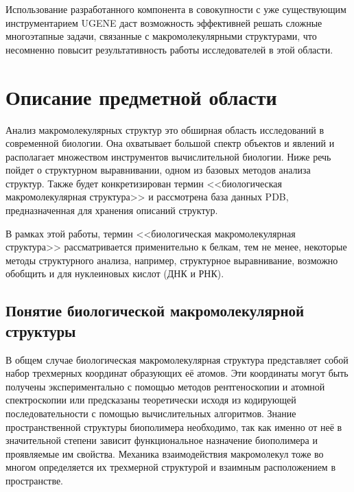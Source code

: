 \documentclass[a4paper, 12pt, titlepage, utf8]{extarticle}
\let\oldsection\section         %
\renewcommand{\section}{\newpage\oldsection}
\newenvironment{myfigure}[2]%
{\pushQED{\caption{#1} \label{#2}} %
    \begin{figure}[!htb]\centering } %
{  \popQED %
    \end{figure}}
\newcommand{\includefigure}[3][]{
\begin{myfigure}{#2}{fig:#3}
    \texttt{[image: \#3]}
\end{myfigure}
}
\begin{document}
Использование разработанного компонента в совокупности с уже существующим инструментарием UGENE даст возможность эффективней решать сложные многоэтапные задачи, связанные с макромолекулярными структурами, что несомненно повысит результативность работы исследователей в этой области.


\section{Описание предметной области}	%
Анализ макромолекулярных структур это обширная область исследований в современной биологии. Она охватывает большой спектр объектов и явлений и располагает множеством инструментов вычислительной биологии. Ниже речь пойдет о структурном выравнивании, одном из базовых методов анализа структур. Также будет конкретизирован термин <<биологическая макромолекулярная структура>> и рассмотрена база данных PDB, предназначенная для хранения описаний структур.

В рамках этой работы, термин <<биологическая макромолекулярная структура>> рассматривается применительно к белкам, тем не менее, некоторые методы структурного анализа, например, структурное выравнивание, возможно обобщить и для нуклеиновых кислот (ДНК и РНК).

\subsection{Понятие биологической макромолекулярной структуры}
В общем случае биологическая макромолекулярная структура представляет собой набор трехмерных координат образующих её атомов. Эти координаты могут быть получены экспериментально с помощью методов рентгеноскопии и атомной спектроскопии или предсказаны теоретически исходя из кодирующей последовательности с помощью вычислительных алгоритмов. Знание пространственной структуры биополимера необходимо, так как именно от неё в значительной степени зависит функциональное назначение биополимера и проявляемые им свойства. Механика взаимодействия макромолекул тоже во многом определяется их трехмерной структурой и взаимным расположением в пространстве. 

\end{document}
